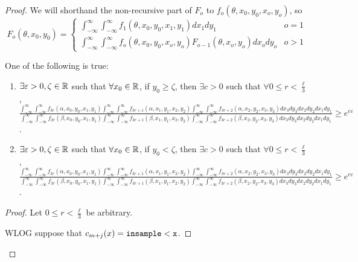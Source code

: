 \begin{proof}
	We will shorthand the non-recursive part of $F_o$ to $f_o(\theta, x_0, y_0, x_o, y_o)$, so
	\[
		F_o(\theta, x_0, y_0) = \begin{cases}
			\int_{-\infty}^\infty\int_{-\infty}^\infty f_1(\theta,x_0, y_0, x_1, y_1)dx_1dy_1 & o = 1\\
			\int_{-\infty}^\infty \int_{-\infty}^\infty f_o(\theta, x_0, y_0, x_o, y_o) F_{o-1}(\theta, x_o, y_o)dx_ody_o & o > 1
		\end{cases}	
	\]
	\begin{lemma}
		One of the following is true: \begin{enumerate}
			\item $\exists \varepsilon>0, \zeta\in \RR$ such that $\forall x_0\in \RR$, if $y_0\geq\zeta$, then $\exists c>0$ such that $\forall 0\leq r< \frac{\ell}{3}$, \\
			$\frac{\int_{-\infty}^\infty \int_{-\infty}^\infty f_{3r}(\alpha, x_0, y_0, x_1, y_1)\int_{-\infty}^\infty \int_{-\infty}^\infty f_{3r+1}(\alpha,x_1, y_1, x_2, y_2)\int_{-\infty}^\infty \int_{-\infty}^\infty f_{3r+2}(\alpha,x_{2}, y_{2}, x_{3}, y_{3}) dx_3dy_3 dx_{2}dy_{2} dx_{1}dy_{1}}
			{\int_{-\infty}^\infty \int_{-\infty}^\infty f_{3r}(\beta, x_0, y_0, x_1, y_1)\int_{-\infty}^\infty \int_{-\infty}^\infty f_{3r+1}(\beta,x_1, y_1, x_2, y_2)\int_{-\infty}^\infty \int_{-\infty}^\infty f_{3r+2}(\beta,x_{2}, y_{2}, x_{3}, y_{3}) dx_3dy_3 dx_{2}dy_{2} dx_{1}dy_{1}}\geq e^{c\varepsilon}$.
			\item $\exists \varepsilon>0, \zeta\in \RR$ such that $\forall x_0\in \RR$, if $y_0<\zeta$, then $\exists c>0$ such that $\forall 0\leq r< \frac{\ell}{3}$, \\
			$\frac{\int_{-\infty}^\infty \int_{-\infty}^\infty f_{3r}(\alpha, x_0, y_0, x_1, y_1)\int_{-\infty}^\infty \int_{-\infty}^\infty f_{3r+1}(\alpha,x_1, y_1, x_2, y_2)\int_{-\infty}^\infty \int_{-\infty}^\infty f_{3r+2}(\alpha,x_{2}, y_{2}, x_{3}, y_{3}) dx_3dy_3 dx_{2}dy_{2} dx_{1}dy_{1}}
			{\int_{-\infty}^\infty \int_{-\infty}^\infty f_{3r}(\beta, x_0, y_0, x_1, y_1)\int_{-\infty}^\infty \int_{-\infty}^\infty f_{3r+1}(\beta,x_1, y_1, x_2, y_2)\int_{-\infty}^\infty \int_{-\infty}^\infty f_{3r+2}(\beta,x_{2}, y_{2}, x_{3}, y_{3}) dx_3dy_3 dx_{2}dy_{2} dx_{1}dy_{1}}\geq e^{c\varepsilon}$.
		\end{enumerate}
	\end{lemma}
	\begin{proof}
		Let $0\leq r< \frac{\ell}{3}$ be arbitrary. 

		WLOG suppose that $c_{m+j}(x)=\lguard[\texttt{x}]$. 


\end{proof}
\end{proof}
